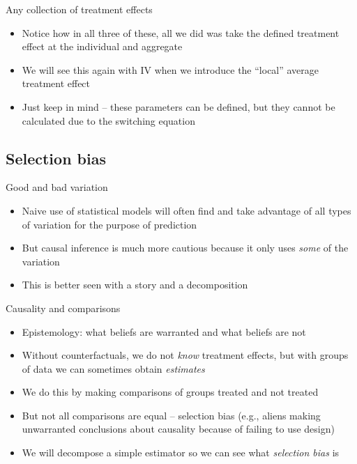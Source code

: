 \documentclass{beamer}
\begin{document}
\begin{frame}{Any collection of treatment effects}

  \begin{itemize}
    \item Notice how in all three of these, all we did was take the defined treatment effect at the individual and aggregate
    \item We will see this again with IV when we introduce the ``local'' average treatment effect
    \item Just keep in mind -- these parameters can be defined, but they cannot be calculated due to the switching equation
  \end{itemize}

\end{frame}

\subsection{Selection bias}

\begin{frame}{Good and bad variation}

  \begin{itemize}
    \item Naive use of statistical models will often find and take advantage of all types of variation for the purpose of prediction
    \item But causal inference is much more cautious because it only uses \emph{some} of the variation
    \item This is better seen with a story and a decomposition
  \end{itemize}

\end{frame}



\begin{frame}{Causality and comparisons}

  \begin{itemize}
    \item Epistemology: what beliefs are warranted and what beliefs are not
    \item Without counterfactuals, we do not \emph{know} treatment effects, but with groups of data we can sometimes obtain \emph{estimates}
    \item We do this by making comparisons of groups treated and not treated
    \item But not all comparisons are equal -- selection bias (e.g., aliens making unwarranted conclusions about causality because of failing to use design)
    \item We will decompose a simple estimator so we can see what \emph{selection bias} is
  \end{itemize}
\end{frame}
\end{document}
